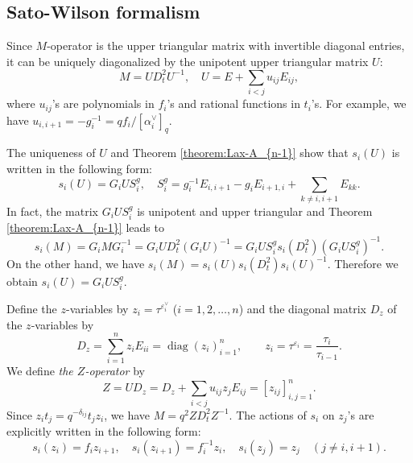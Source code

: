 \documentclass[12pt,twoside]{article}
\newcommand\av{\alpha^\vee}
\newcommand\eps{\varepsilon}
\newcommand\epsv{\eps^\vee}
\newcommand\diag{\mathop{\mathrm{diag}}\nolimits}
\theoremstyle{plain} %
\theoremstyle{definition} %
\theoremstyle{definition} %
\numberwithin{theorem}{section}
\numberwithin{equation}{section}
\numberwithin{figure}{section}
\numberwithin{table}{section}
\newcommand\theoremref[1]{Theorem \ref{#1}}
\begin{document}

\subsection{Sato-Wilson formalism}
\label{sec:SW-A_{n-1}}

Since $M$-operator is the upper triangular matrix with
invertible diagonal entries, 
it can be uniquely diagonalized 
by the unipotent upper triangular matrix $U$:
\begin{equation*}
 M = U D_t^2 U^{-1}, \quad
 U = E + \sum_{i<j} u_{ij} E_{ij},
\end{equation*}
where $u_{ij}$'s are polynomials in $f_i$'s and
rational functions in $t_i$'s. 
For example, we have $u_{i,i+1} = - g_i^{-1} = qf_i/[\av_i]_q$. 

The uniqueness of $U$ and \theoremref{theorem:Lax-A_{n-1}} show that
$s_i(U)$ is written in the following form:
\begin{equation}
 s_i(U) = G_i U S_i^g, \quad
 S_i^g = g_i^{-1} E_{i,i+1} - g_i E_{i+1,i} + \sum_{k\ne i,i+1} E_{kk}.
 \label{eq:s_i(U)}
\end{equation}
In fact, the matrix $G_i U S_i^g$ is unipotent and upper triangular 
and \theoremref{theorem:Lax-A_{n-1}} leads to
\begin{equation*}
 s_i(M) 
 = G_i M G_i^{-1}
 = G_i U D_t^2 (G_i U)^{-1}
 = G_i U S_i^g s_i(D_t^2) (G_i U S_i^g)^{-1}.
\end{equation*}
On the other hand, we have $s_i(M)=s_i(U)s_i(D_t^2)s_i(U)^{-1}$.
Therefore we obtain $s_i(U)=G_i U S_i^g$.

Define the $z$-variables by $z_i = \tau^{\epsv_i}$ ($i=1,2,\ldots,n$) 
and the diagonal matrix $D_z$ of the $z$-variables by
\begin{equation*}
 D_z = \sum_{i=1}^n z_i E_{ii} = \diag(z_i)_{i=1}^n,
 \qquad z_i = \tau^{\eps_i} = \frac{\tau_i}{\tau_{i-1}}.
\end{equation*}
We define {\em the $Z$-operator} by
\begin{equation*}
 Z = U D_z = D_z + \sum_{i<j} u_{ij}z_j E_{ij} = [z_{ij}]_{i,j=1}^n.
\end{equation*}
Since $z_i t_j = q^{-\delta_{ij}} t_j z_i$, 
we have $M = q^2 Z D_t^2 Z^{-1}$. 
The actions of $s_i$ on $z_j$'s are explicitly written in the following form:
\begin{equation*}
 s_i(z_i)= f_i z_{i+1}, \quad
 s_i(z_{i+1}) = f_i^{-1} z_i, \quad
 s_i(z_j) = z_j \quad (j\ne i,i+1).
\end{equation*}
\end{document}
